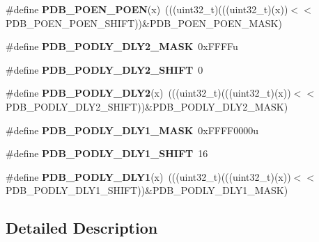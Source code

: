 \begin{DoxyCompactItemize}
\item 
\#define {\bfseries P\+D\+B\+\_\+\+P\+O\+E\+N\+\_\+\+P\+O\+EN}(x)~(((uint32\+\_\+t)(((uint32\+\_\+t)(x))$<$$<$P\+D\+B\+\_\+\+P\+O\+E\+N\+\_\+\+P\+O\+E\+N\+\_\+\+S\+H\+I\+FT))\&P\+D\+B\+\_\+\+P\+O\+E\+N\+\_\+\+P\+O\+E\+N\+\_\+\+M\+A\+SK)\hypertarget{group__PDB__Register__Masks_gaf0b83a8c4124b3bdf53e5173d121db0f}{}\label{group__PDB__Register__Masks_gaf0b83a8c4124b3bdf53e5173d121db0f}

\item 
\#define {\bfseries P\+D\+B\+\_\+\+P\+O\+D\+L\+Y\+\_\+\+D\+L\+Y2\+\_\+\+M\+A\+SK}~0x\+F\+F\+F\+Fu\hypertarget{group__PDB__Register__Masks_ga1b7c6a0b290ea82908b74e7b8c2f4009}{}\label{group__PDB__Register__Masks_ga1b7c6a0b290ea82908b74e7b8c2f4009}

\item 
\#define {\bfseries P\+D\+B\+\_\+\+P\+O\+D\+L\+Y\+\_\+\+D\+L\+Y2\+\_\+\+S\+H\+I\+FT}~0\hypertarget{group__PDB__Register__Masks_gaa576ed647be6411616c3f6e6d03ab47c}{}\label{group__PDB__Register__Masks_gaa576ed647be6411616c3f6e6d03ab47c}

\item 
\#define {\bfseries P\+D\+B\+\_\+\+P\+O\+D\+L\+Y\+\_\+\+D\+L\+Y2}(x)~(((uint32\+\_\+t)(((uint32\+\_\+t)(x))$<$$<$P\+D\+B\+\_\+\+P\+O\+D\+L\+Y\+\_\+\+D\+L\+Y2\+\_\+\+S\+H\+I\+FT))\&P\+D\+B\+\_\+\+P\+O\+D\+L\+Y\+\_\+\+D\+L\+Y2\+\_\+\+M\+A\+SK)\hypertarget{group__PDB__Register__Masks_ga47e4784ba83a37ab49598af71889500c}{}\label{group__PDB__Register__Masks_ga47e4784ba83a37ab49598af71889500c}

\item 
\#define {\bfseries P\+D\+B\+\_\+\+P\+O\+D\+L\+Y\+\_\+\+D\+L\+Y1\+\_\+\+M\+A\+SK}~0x\+F\+F\+F\+F0000u\hypertarget{group__PDB__Register__Masks_ga548246bef07975bd6f1fe0fe5a2c6ef5}{}\label{group__PDB__Register__Masks_ga548246bef07975bd6f1fe0fe5a2c6ef5}

\item 
\#define {\bfseries P\+D\+B\+\_\+\+P\+O\+D\+L\+Y\+\_\+\+D\+L\+Y1\+\_\+\+S\+H\+I\+FT}~16\hypertarget{group__PDB__Register__Masks_ga0890f882369124f86428eea14c2eac88}{}\label{group__PDB__Register__Masks_ga0890f882369124f86428eea14c2eac88}

\item 
\#define {\bfseries P\+D\+B\+\_\+\+P\+O\+D\+L\+Y\+\_\+\+D\+L\+Y1}(x)~(((uint32\+\_\+t)(((uint32\+\_\+t)(x))$<$$<$P\+D\+B\+\_\+\+P\+O\+D\+L\+Y\+\_\+\+D\+L\+Y1\+\_\+\+S\+H\+I\+FT))\&P\+D\+B\+\_\+\+P\+O\+D\+L\+Y\+\_\+\+D\+L\+Y1\+\_\+\+M\+A\+SK)\hypertarget{group__PDB__Register__Masks_gae6b4c6aa88511e952d5cd0938d11d854}{}\label{group__PDB__Register__Masks_gae6b4c6aa88511e952d5cd0938d11d854}

\end{DoxyCompactItemize}


\subsection{Detailed Description}
